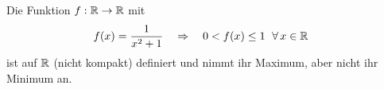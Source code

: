 \begin{satz}
    \begin{beispiel}
        Die Funktion $f: \mathbb{R}\rightarrow{}\mathbb{R}$ mit
        \begin{align*}
            f(x) &= \frac{1}{x^2+1}\quad\Rightarrow{}\quad 0 < f(x)\leq 1~\;\forall\, x\in\mathbb{R}
        \end{align*}
        ist auf $\mathbb{R}$ (nicht kompakt) definiert und nimmt ihr Maximum, aber nicht ihr Minimum an.
    \end{beispiel}
\end{satz}

\newpage